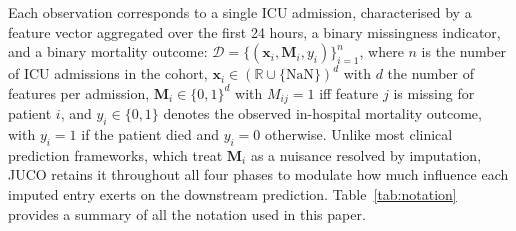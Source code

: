 \documentclass[journal]{IEEEtran}
\begin{document}
	Each observation corresponds to a single ICU admission, characterised by a feature vector aggregated over the first 24 hours, a binary missingness indicator, and a binary mortality outcome:
	$\mathcal{D}=\{(\mathbf{x}_i,\mathbf{M}_i,y_i)\}_{i=1}^{n}$,
	where $n$ is the number of ICU admissions in the cohort, $\mathbf{x}_i\in(\mathbb{R}\cup\{\text{NaN}\})^d$ with $d$ the number of features per admission,
	$\mathbf{M}_i\in\{0,1\}^d$ with $M_{ij}=1$ iff feature $j$ is missing for patient $i$, and $y_i\in\{0,1\}$ denotes the observed in-hospital mortality outcome, with $y_i=1$ if the patient died and $y_i=0$ otherwise.
	Unlike most clinical prediction frameworks, which treat $\mathbf{M}_i$ as a nuisance resolved by imputation, JUCO retains it throughout all four phases to modulate how much influence each imputed entry exerts on the downstream prediction. Table~\ref{tab:notation} provides a summary of all the notation used in this paper.
	
\end{document}
